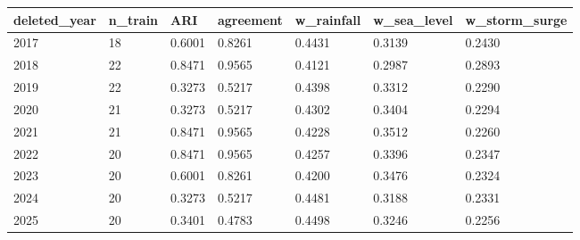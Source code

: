 \begin{tabular}{lllllll}
\hline
deleted\_year & n\_train & ARI & agreement & w\_rainfall & w\_sea\_level & w\_storm\_surge \\
\hline
2017 & 18 & 0.6001 & 0.8261 & 0.4431 & 0.3139 & 0.2430 \\
2018 & 22 & 0.8471 & 0.9565 & 0.4121 & 0.2987 & 0.2893 \\
2019 & 22 & 0.3273 & 0.5217 & 0.4398 & 0.3312 & 0.2290 \\
2020 & 21 & 0.3273 & 0.5217 & 0.4302 & 0.3404 & 0.2294 \\
2021 & 21 & 0.8471 & 0.9565 & 0.4228 & 0.3512 & 0.2260 \\
2022 & 20 & 0.8471 & 0.9565 & 0.4257 & 0.3396 & 0.2347 \\
2023 & 20 & 0.6001 & 0.8261 & 0.4200 & 0.3476 & 0.2324 \\
2024 & 20 & 0.3273 & 0.5217 & 0.4481 & 0.3188 & 0.2331 \\
2025 & 20 & 0.3401 & 0.4783 & 0.4498 & 0.3246 & 0.2256 \\
\hline
\end{tabular}